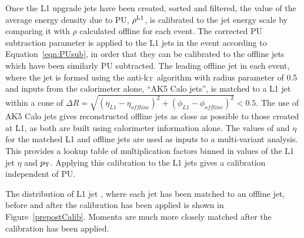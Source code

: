 Once the \ac{L1} upgrade jets have been created, sorted and filtered, the value of the average energy density due to \ac{PU}, $\rho^{\rm L1}$, 
is calibrated to the jet energy scale by comparing it with $\rho$ calculated offline for each event.
The corrected \ac{PU} subtraction parameter is applied to the \ac{L1} jets in the event according to Equation~\ref{eqn:PUsub}, in order that they 
can be calibrated to the offline jets which have been similarly \ac{PU} subtracted.
The leading offline jet in each event, where the jet is formed using the anti-k$_{\rm T}$ algorithm with radius parameter of 0.5 and inputs from the calorimeter alone, ``AK5 Calo jets'', is matched to a L1 jet within a cone of 
$\Delta R = \sqrt{ (\eta_{L1} - \eta_{offline})^2 + (\phi_{L1} - \phi_{offline})^2} < 0.5$.
The use of AK5 Calo jets gives reconstructed offline jets as close as possible to those created at \ac{L1}, as both are built using calorimeter information alone.
The values of \pt and $\eta$ for the matched \ac{L1} and offline jets are used as inputs to a multi-variant analysis.  
This provides a lookup table of multiplication factors binned in values of the L1 jet $\eta$ and $p_{\text{T}}$. 
Applying this calibration to the \ac{L1} jets gives a calibration independent of PU. 

The distribution of L1 jet \pt, where each jet has been matched to an offline jet, before and after the calibration has been applied is shown in Figure~\ref{prepostCalib}. 
Momenta are much more closely matched after the calibration has been applied.

